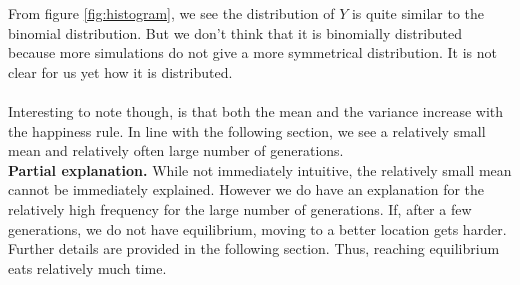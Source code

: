 From figure \ref{fig:histogram}, we see the distribution of $Y$ is quite similar to the binomial distribution. But we don't think that it is binomially distributed because more simulations do not give a more symmetrical distribution. It is not clear for us yet how it is distributed.\\
\\
Interesting to note though, is that both the mean and the variance increase with the happiness rule. In line with the following section, we see a relatively small mean and relatively often large number of generations.\\
\textbf{Partial explanation.} While not immediately intuitive, the relatively small mean cannot be immediately explained. However we do have an explanation for the relatively high frequency for the large number of generations. If, after a few generations, we do not have equilibrium, moving to a better location gets harder. Further details are provided in the following section. Thus, reaching equilibrium eats relatively much time.